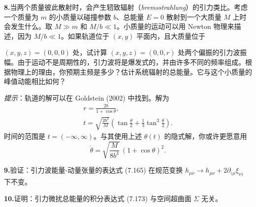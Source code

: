 \textbf{8.}\quad 当两个质量彼此散射时，会产生轫致辐射（\emph{bremsstrahlung}）的引力类比。考虑一个质量为 $m$ 的小质量以碰撞参数 $b$、总能量 $E = 0$ 散射到一个大质量 $M$ 上时会发生什么。取 $M \gg m$ 和 $M/b \ll 1$。小质量的运动可以用 Newton 物理来描述，因为 $M/b \ll 1$。如果轨道位于 $(x, y)$ 平面内，且大质量位于


$(x, y, z) = (0, 0, 0)$ 处，试计算 $(x, y, z) = (0, 0, r)$ 处两个偏振的引力波振幅。由于运动不是周期性的，引力波将是爆发式的，并由许多不同的频率组成。根据物理上的理由，你预期主频是多少？估计系统辐射的总能量。它与这个小质量的峰值动能相比如何？

\emph{提示}：轨道的解可以在 Goldstein (2002) 中找到。解为
\begin{gather*}
r = \frac{2b}{1+\cos\theta},\\
t = \sqrt{\frac{2b^3}{M}}\left(\tan\frac{\theta}{2} + \frac{1}{3}\tan^3\frac{\theta}{2}\right).
\end{gather*}
时间的范围是 $t = (-\infty, \infty)$。与其使用上述 $\theta(t)$ 的隐式解，你或许更愿意用
\begin{equation*}
\dot{\theta} = \sqrt{\frac{M}{8b^3}}\,(1+\cos\theta)^2.
\end{equation*}

\textbf{9.}\quad 验证：引力波能量-动量张量的表达式 (7.165) 在规范变换 $h_{\mu\nu} \to h_{\mu\nu} + 2\partial_{(\mu}\xi_{\nu)}$ 下不变。

\textbf{10.}\quad 证明：引力微扰总能量的积分表达式 (7.173) 与空间超曲面 $\Sigma$ 无关。
